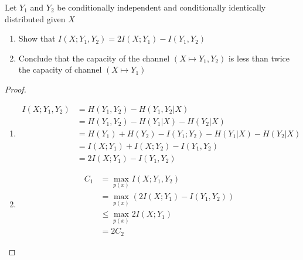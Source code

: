 \begin{exercise}{ Let $Y_{1}$ and $Y_{2}$ be conditionally independent and conditionally identically distributed given
  $X$
  \begin{enumerate}
    \item Show that $I\left(X ; Y_{1}, Y_{2}\right)=2 I\left(X ; Y_{1}\right)-I\left(Y_{1}, Y_{2}\right)$
    \item Conclude that the capacity of the channel $(X\mapsto Y_1,Y_2)$ is less than twice the capacity of channel $(X \mapsto Y_1)$
  \end{enumerate} }
  \begin{proof}
  \par{~}
  \begin{enumerate}
    \item {
      \begin{equation}
        \begin{aligned}
          I(X;Y_1,Y_2) &= H(Y_1,Y_2) - H(Y_1,Y_2|X) \\
          &= H(Y_1,Y_2) - H(Y_1|X) - H(Y_2|X) \\
          &= H(Y_1) + H(Y_2) - I(Y_1;Y_2) -  H(Y_1|X) - H(Y_2|X) \\
          &=I(X;Y_1) + I(X;Y_2)- I(Y_1,Y_2) \\
          &= 2I(X;Y_1) - I(Y_1,Y_2)
        \end{aligned}
      \end{equation}
     }
    \item { 
\begin{equation}
  \begin{aligned}
    C_1 &= \max_{p(x)} I(X;Y_1,Y_2) \\
    &= \max_{p(x)} (2I(X;Y_1) - I(Y_1,Y_2)) \\
    &\le \max_{p(x)} 2I(X;Y_1) \\
    &= 2C_2
  \end{aligned}
\end{equation}
    }
  \end{enumerate}
  \end{proof}
  \label{ex2}
\end{exercise}

